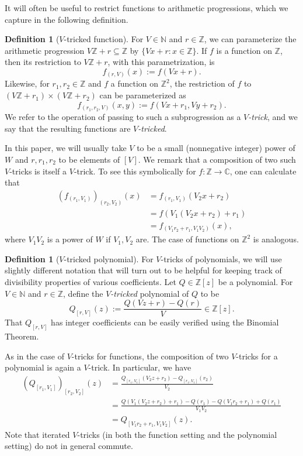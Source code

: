 \documentclass[11pt]{amsart}
\theoremstyle{definition}
\newtheorem{definition}[lemma]{Definition}
\newcommand{\Z}{{\mathbb Z}}
\begin{document}
It will often be useful to restrict functions to arithmetic progressions, which we capture in the following definition.
\begin{definition}[$V$-tricked function]\label{d:Vtrickfunction}
For $V \in \mathbb{N}$ and $r \in \mathbb{Z}$, we can parameterize the arithmetic progression $V\mathbb{Z}+r \subseteq \mathbb{Z}$ by $\{Vx+r: x \in \mathbb{Z}\}$.  If $f$ is a function on $\mathbb{Z}$, then its restriction to $V\mathbb{Z}+r$, with this parametrization, is
$$f_{(r,V)}(x):=f(Vx+r).$$
Likewise, for $r_1,r_2 \in \mathbb{Z}$ and $f$ a function on $\mathbb{Z}^2$, the restriction of $f$ to $(V \mathbb{Z} +r_1) \times (V\mathbb{Z}+r_2)$ can be parameterized as
$$f_{(r_1,r_2,V)}(x,y):=f(Vx+r_1,Vy+r_2).$$
We refer to the operation of passing to such a subprogression as a \emph{$V$-trick}, and we say that the resulting functions are \emph{$V$-tricked}.  
\end{definition}
In this paper, we will usually take $V$ to be a small (nonnegative integer) power of $W$ and $r,r_1,r_2$ to be elements of $[V]$. We remark that a composition of two such $V$-tricks is itself a $V$-trick.  To see this symbolically for $f: \mathbb{Z} \to \mathbb{C}$, one can calculate that
\begin{align*}
(f_{(r_1,V_1)})_{(r_2,V_2)}(x) &=f_{(r_1,V_1)}(V_2 x+r_2)\\
 &=f(V_1(V_2 x+r_2)+r_1)\\
 &=f_{(V_1 r_2+r_1,V_1V_2)}(x),
\end{align*}
where $V_1V_2$ is a power of $W$ if $V_1,V_2$ are. The case of functions on $\mathbb{Z}^2$ is analogous.
\begin{definition}[$V$-tricked polynomial]\label{d: Vtrickpolynomial}
For $V$-tricks of polynomials, we will use slightly different notation that will turn out to be helpful for keeping track of divisibility properties of various coefficients.  Let $Q \in \mathbb{Z}[z]$ be a polynomial.  For $V \in \mathbb{N}$ and $r \in\Z$, define the \emph{$V$-tricked} polynomial of $Q$ to be
$$Q_{[r, V]}(z) := \frac{Q(Vz + r) - Q(r)}{V} \in \mathbb{Z}[z].$$
That $Q_{[r,V]}$ has integer coefficients can be easily verified using the Binomial Theorem.    
\end{definition}
As in the case of $V$-tricks for functions, the composition of two $V$-tricks for a polynomial is again a $V$-trick.  In particular, we have
\begin{align*}
(Q_{[r_1, V_1]})_{[r_2, V_2]}(z) &= \frac{Q_{[r_1, V_1]}(V_2z + r_2) - Q_{[r_1, V_1]}(r_2)}{V_2} \\
&= \frac{Q(V_1(V_2z + r_2) + r_1) - Q(r_1) - Q(V_1r_2 + r_1) + Q(r_1)}{V_1V_2} \\
&= Q_{[V_1r_2 + r_1, V_1V_2]}(z).
\end{align*}
Note that iterated $V$-tricks (in both the function setting and the polynomial setting) do not in general commute. 
\end{document}
